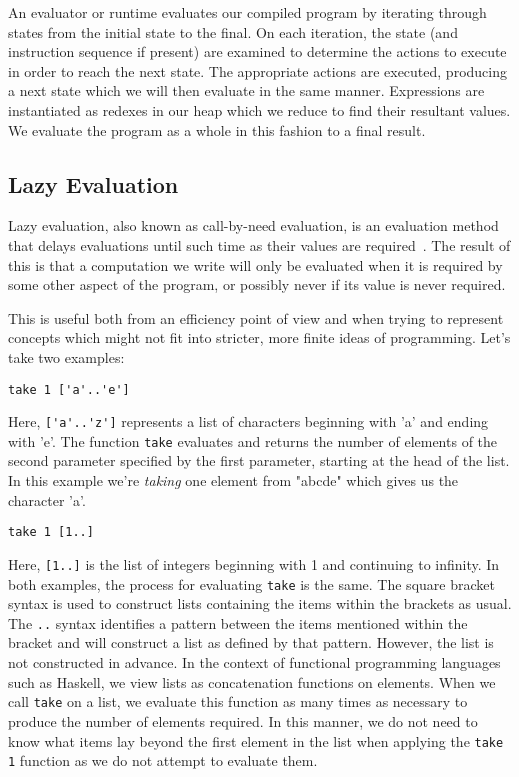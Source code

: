 An evaluator or runtime evaluates our compiled program by iterating through
states from the initial state to the final. On each iteration, the state
(and instruction sequence if present) are examined to determine the actions
to execute in order to reach the next state. The appropriate actions are
executed, producing a next state which we will then evaluate in the same
manner. Expressions are instantiated as redexes in our heap which we reduce
to find their resultant values. We evaluate the program as a whole in this
fashion to a final result.

\subsection{Lazy Evaluation}
Lazy evaluation, also known as call-by-need evaluation, is an evaluation method
that delays evaluations until such time as their values are required~\cite[pp.33]{SPJ}. 
The result of this is that a computation we write will only be 
evaluated when it is required by some other aspect of the program, or possibly never
if its value is never required. 

This is useful both from an efficiency point of view and when trying to 
represent concepts which might not fit into stricter, more finite ideas of
programming. Let's take two examples:

\begin{center}
	\verb!take 1 ['a'..'e']!
\end{center}

\noindent Here, \verb!['a'..'z']! represents a list of characters beginning with 'a' and 
ending with 'e'. The function \verb!take! evaluates and returns the number of
elements of the second parameter specified by the first parameter, starting at the
head of the list. In this example we're \emph{taking} one element from "abcde" which
gives us the character 'a'. 

\begin{center}
	\verb!take 1 [1..]!
\end{center}

\noindent Here, \verb![1..]! is the list of integers beginning with 1 and continuing 
to infinity. In both examples, the process for evaluating  \verb!take! is the same. 
The square bracket
syntax is used to construct lists containing the items within the brackets as usual.
The \verb!..! syntax identifies a pattern between the items mentioned within the
bracket and will construct a list as defined by that pattern. However, the list is
not constructed in advance. In the context of functional programming languages such
as Haskell, we view lists as concatenation functions on elements. When we call
\verb!take! on a list, we evaluate this function as many times as
necessary to produce the number of elements required. In this manner, we do not
need to know what items lay beyond the first element in the list when applying the
\verb!take 1! function as we do not attempt to evaluate them.

